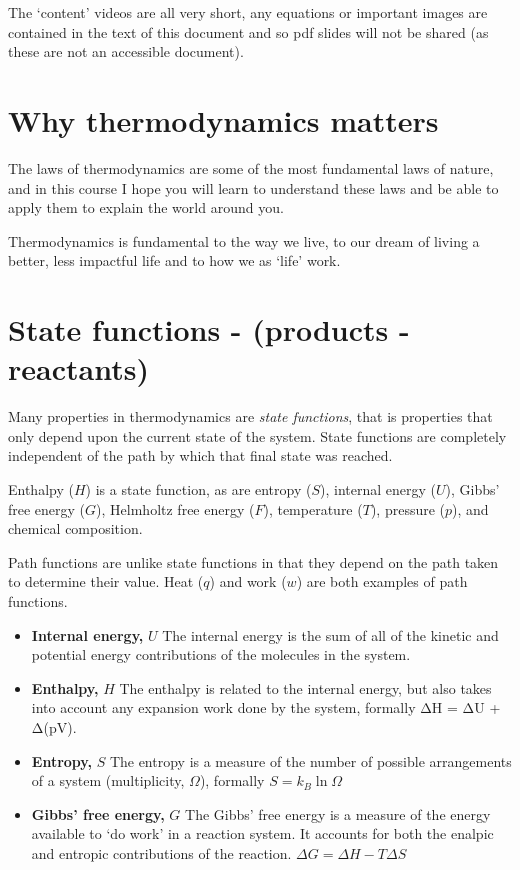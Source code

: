 \documentclass[
]{book}
\begin{document}
The `content' videos are all very short, any equations or important images are contained in the text of this document and so pdf slides will not be shared (as these are not an accessible document).

\hypertarget{sec:whyjustwhy}{%
\section{Why thermodynamics matters}\label{sec:whyjustwhy}}

The laws of thermodynamics are some of the most fundamental laws of nature, and in this course I hope you will learn to understand these laws and be able to apply them to explain the world around you.

Thermodynamics is fundamental to the way we live, to our dream of living a better, less impactful life and to how we as `life' work.

\hypertarget{sec:state}{%
\section{State functions - (products - reactants)}\label{sec:state}}

Many properties in thermodynamics are \emph{state functions}, that is properties that only depend upon the current state of the system. State functions are completely independent of the path by which that final state was reached.

Enthalpy (\(H\)) is a state function, as are entropy (\(S\)), internal energy (\(U\)), Gibbs' free energy (\(G\)), Helmholtz free energy (\(F\)), temperature (\(T\)), pressure (\(p\)), and chemical composition.

Path functions are unlike state functions in that they depend on the path taken to determine their value.
Heat (\(q\)) and work (\(w\)) are both examples of path functions.

\begin{itemize}
\item
  \textbf{Internal energy,} \(U\) The internal energy is the sum of all of the kinetic and potential energy contributions of the molecules in the system.
\item
  \textbf{Enthalpy,} \(H\) The enthalpy is related to the internal energy, but also takes into account any expansion work done by the system, formally ΔH = ΔU + Δ(pV).
\item
  \textbf{Entropy,} \(S\) The entropy is a measure of the number of possible arrangements of a system (multiplicity, \(Ω\)), formally \(S = k_B \ln Ω\)
\item
  \textbf{Gibbs' free energy,} \(G\) The Gibbs' free energy is a measure of the energy available to `do work' in a reaction system. It accounts for both the enalpic and entropic contributions of the reaction. \(\Delta G = \Delta H − T \Delta S\)
\end{itemize}
\end{document}
